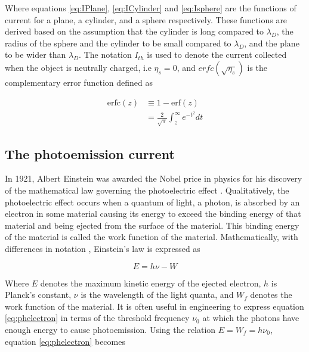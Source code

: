 Where equations \eqref{eq:IPlane}, \eqref{eq:ICylinder} and \eqref{eq:Isphere} are the functions of current for a plane, a cylinder, and a sphere respectively. These functions are derived based on the assumption that the cylinder is long compared to $\lambda_D$, the radius of the sphere and the cylinder to be small compared to $\lambda_D$, and the plane to be wider than $\lambda_D$. The notation $I_{th}$ is used to denote the current collected when the object is neutrally charged, i.e $\eta_s = 0$, and $erfc(\sqrt{\eta_s})$ is the complementary error function defined as

\begin{subequations}
    \begin{align*}
        \text{erfc}(z) &\equiv 1 - \text{erf}(z) \\
        &= \frac{2}{\sqrt{\pi}} \int^\infty_z e^{-t^2} dt
    \end{align*}
\end{subequations}


\subsection*{The photoemission current}
In 1921, Albert Einstein was awarded the Nobel price in physics for his discovery of the mathematical law governing the photoelectric effect \parencite{NobelMediaAB}. Qualitatively, the photoelectric effect occurs when a quantum of light, a photon, is absorbed by an electron in some material causing its energy to exceed the binding energy of that material and being ejected from the surface of the material. This binding energy of the material is called the work function of the material. Mathematically, with differences in notation \parencite{Einstein1905}, Einstein's law is expressed as

\begin{equation}\label{eq:phelectron}
    E = h \nu - W
\end{equation}

Where $E$ denotes the maximum kinetic energy of the ejected electron, $h$ is Planck's constant, $\nu$ is the wavelength of the light quanta, and $W_f$ denotes the work function of the material. It is often useful in engineering to express equation \eqref{eq:phelectron} in terms of the threshold frequency $\nu_0$ at which the photons have enough energy to cause photoemission. Using the relation $E = W_f = h \nu_0$, equation \eqref{eq:phelectron} becomes

